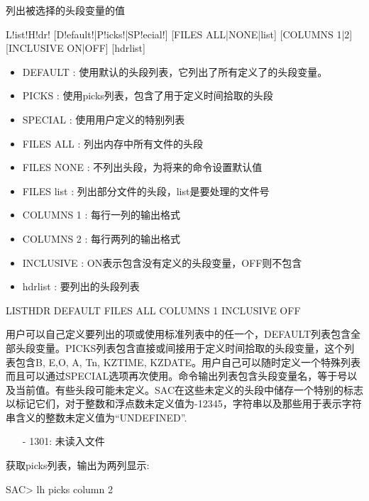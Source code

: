 \label{cmd:listhdr}

列出被选择的头段变量的值

\begin{SACSTX}
L!ist!H!dr! [D!efault!|P!icks!|SP!ecial!] [FILES ALL|NONE|list] [COLUMNS 1|2] 
    [INCLUSIVE ON|OFF] [hdrlist]
\end{SACSTX}

\begin{itemize}
\item DEFAULT : 使用默认的头段列表，它列出了所有定义了的头段变量。
\item PICKS : 使用picks列表，包含了用于定义时间拾取的头段 
\item SPECIAL :  使用用户定义的特别列表 
\item FILES ALL : 列出内存中所有文件的头段 
\item FILES NONE : 不列出头段，为将来的命令设置默认值 
\item FILES list : 列出部分文件的头段，list是要处理的文件号 
\item COLUMNS 1 : 每行一列的输出格式  
\item COLUMNS 2 : 每行两列的输出格式  
\item INCLUSIVE :  ON表示包含没有定义的头段变量，OFF则不包含 
\item hdrlist : 要列出的头段列表  
\end{itemize}

\begin{SACDFT}
LISTHDR DEFAULT FILES ALL COLUMNS 1 INCLUSIVE OFF
\end{SACDFT}

用户可以自己定义要列出的项或使用标准列表中的任一个，DEFAULT列表包含全部头段变量。PICKS列表包含直接或间接用于定义时间拾取的头段变量，这个列表包含B, E,O, A, Tn, KZTIME, KZDATE。用户自己可以随时定义一个特殊列表而且可以通过SPECIAL选项再次使用。命令输出列表包含头段变量名，等于号以及当前值。有些头段可能未定义。SAC在这些未定义的头段中储存一个特别的标志以标记它们，对于整数和浮点数未定义值为-12345，字符串以及那些用于表示字符串含义的整数未定义值为``UNDEFINED''.

\begin{itemize}
\item[-]1301: 未读入文件
\end{itemize}

获取picks列表，输出为两列显示:
\begin{SACCode}
SAC> lh picks column 2
\end{SACCode}

